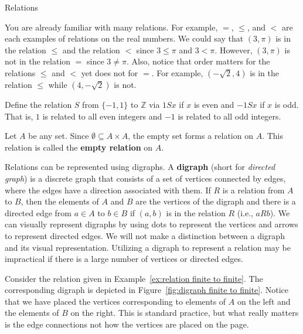\begin{section}{Relations}
\begin{example}
You are already familiar with many relations.  For example, $=$, $\leq$, and $<$ are each examples of relations on the real numbers. We could say that $(3,\pi)$ is in the relation $\leq$ and the relation $<$ since $3\leq \pi$ and $3<\pi$.  However, $(3,\pi)$ is not in the relation $=$ since $3\neq \pi$.  Also, notice that order matters for the relations $\leq$ and $<$ yet does not for $=$. For example, $(-\sqrt{2}, 4)$ is in the relation $\leq$ while $(4,-\sqrt{2})$ is not.
\end{example}


\begin{example}
Define the relation $S$ from $\{-1,1\}$ to $\mathbb{Z}$ via $1Sx$ if $x$ is even and $-1Sx$ if $x$ is odd.  That is, $1$ is related to all even integers and $-1$ is related to all odd integers.
\end{example}

\begin{example}
Let $A$ be any set.  Since $\emptyset \subseteq A\times A$, the empty set forms a relation on $A$. This relation is called the \textbf{empty relation} on $A$.
\end{example}

Relations can be represented using digraphs. A \textbf{digraph} (short for \emph{directed graph}) is a discrete graph that consists of a set of vertices connected by edges, where the edges have a direction associated with them. If $R$ is a relation from $A$ to $B$, then the elements of $A$ and $B$ are the vertices of the digraph and there is a directed edge from $a\in A$ to $b\in B$ if $(a,b)$ is in the relation $R$ (i.e., $aR b$). We can visually represent digraphs by using dots to represent the vertices and arrows to represent directed edges. We will not make a distinction between a digraph and its visual representation. Utilizing a digraph to represent a relation may be impractical if there is a large number of vertices or directed edges. 

\begin{example}
Consider the relation given in Example~\ref{ex:relation finite to finite}.  The corresponding digraph is depicted in Figure~\ref{fig:digraph finite to finite}. Notice that we have placed the vertices corresponding to elements of $A$ on the left and the elements of $B$ on the right.  This is standard practice, but what really matters is the edge connections not how the vertices are placed on the page.
\end{example}


\end{section}
